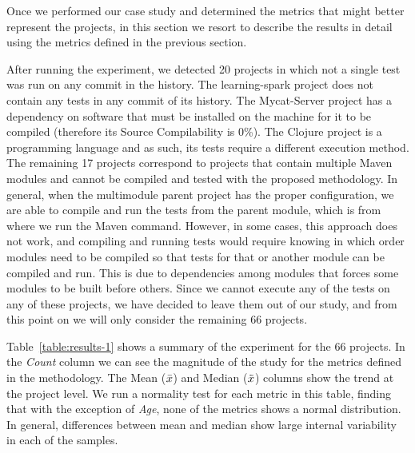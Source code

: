 Once we performed our case study and determined the metrics that might better represent the projects, in this section we resort to describe the results in detail using the metrics defined in the previous section.

After running the experiment, we detected 20 projects in which not a single test was run on any commit in the history. 
The learning-spark project does not contain any tests in any commit of its history. 
The Mycat-Server project has a dependency on software that must be installed on the machine for it to be compiled (therefore its Source Compilability is 0\%). 
The Clojure project is a programming language and as such, its tests require a different execution method. 
The remaining 17 projects correspond to projects that contain multiple Maven modules and cannot be compiled and tested with the proposed methodology. In general, when the multimodule parent project has the proper configuration, we are able to compile and run the tests from the parent module, which is from where we run the Maven command. However, in some cases, this approach does not work, and compiling and running tests would require knowing in which order modules need to be compiled so that tests for that or another module can be compiled and run. This is due to dependencies among modules that forces some modules to be built before others. 
Since we cannot execute any of the tests on any of these projects, we have decided to leave them out of our study, and from this point on we will only consider the remaining 66 projects.

%     

Table~\ref{table:results-1} shows a summary of the experiment for the 66 projects. 
In the \textit{Count} column we can see the magnitude of the study for the metrics defined in the methodology. 
The Mean ({\large$\bar{x}$}) and Median ({\large$\tilde{x}$}) columns show the trend at the project level.
We run a normality test for each metric in this table, finding that with the exception of \textit{Age}, none of the metrics shows a normal distribution. 
In general, differences between mean and median show large internal variability in each of the samples.


